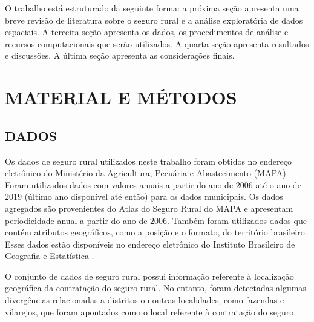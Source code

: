 O trabalho está estruturado da seguinte forma: a próxima seção apresenta uma breve revisão de literatura sobre o seguro rural e a análise exploratória de dados espaciais. A terceira seção apresenta os dados, os procedimentos de análise e recursos computacionais que serão utilizados. A quarta seção apresenta resultados e discussões. A última seção apresenta as considerações finais.



\section{MATERIAL E MÉTODOS}\label{material_e_metodos}


\subsection{DADOS}


Os dados de seguro rural utilizados neste trabalho foram obtidos no endereço eletrônico do Ministério da Agricultura, Pecuária e Abastecimento (MAPA) \cite{brasil21}. Foram utilizados dados com valores anuais a partir do ano de $2006$ até o ano de $2019$ (último ano disponível até então) para os dados municipais. Os dados agregados são provenientes do Atlas do Seguro Rural do MAPA e apresentam periodicidade anual a partir do ano de $2006$. Também foram utilizados dados que contém atributos geográficos, como a posição e o formato, do território brasileiro. Esses dados estão disponíveis no endereço eletrônico do Instituto Brasileiro de Geografia e Estatística \cite{ibge20}.

O conjunto de dados de seguro rural possui informação referente à localização geográfica da contratação do seguro rural. No entanto, foram detectadas algumas divergências relacionadas a distritos ou outras localidades, como fazendas e vilarejos, que foram apontados como o local referente à contratação do seguro. 

